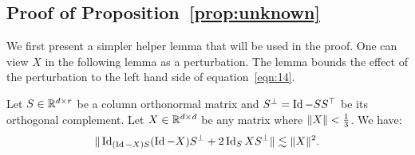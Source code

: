 \subsection{Proof of Proposition~\ref{prop:unknown}}

We first present a simpler helper lemma that will be used in the proof. 
One can view $X$ in the following lemma as a perturbation. The lemma bounds the effect of the perturbation to the left hand side of equation~\eqref{eqn:14}. 
\begin{lem}\label{lem:projection_change}
	Let $S \in \mathbb{R}^{d \times r}$ be a column orthonormal matrix and
	$S^{\bot} = \operatorname{Id} - SS^{\top}$ be its orthogonal complement.
	Let $X \in \mathbb{R}^{d\times d}$ be any matrix where $\|X\| < \frac{1}{3}$.
	We have:
	\begin{align}
	\|\operatorname{Id}_{(\operatorname{Id} - X) S} (\operatorname{Id} - X) S^{\bot} + 2\operatorname{Id}_S X S^{\bot}\|
	\lesssim \|X\|^2. \label{eqn:14}
	\end{align} 	
\end{lem}

